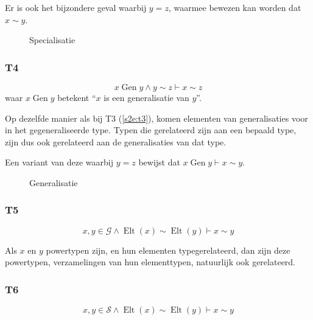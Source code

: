 \documentclass{article}
\newcommand{\Gen}{\ensuremath{\operatorname{Gen}}}
\begin{document}
Er is ook het bijzondere geval waarbij $y=z$, waarmee bewezen kan worden
dat $x \sim y$.

\begin{figure}
  \centering
  \caption{Specialisatie}
  \label{fig:specialisatie}
\end{figure}


\subsubsection{T4}
\[
  x \operatorname{Gen} y \wedge y \sim z \vdash x \sim z
\] waar $x \operatorname{Gen} y$ betekent ``$x$ is een generalisatie van $y$''.

Op dezelfde manier als bij T3 (\ref{s2e:t3}), komen elementen van
generalisaties voor in het gegeneraliseerde type. Typen die gerelateerd zijn aan 
een bepaald type, zijn dus ook gerelateerd aan de generalisaties
van dat type.

Een variant van deze waarbij $y=z$ bewijst dat $x \Gen y \vdash x \sim y$.


\begin{figure}[b]
  \centering
  \caption{Generalisatie}
  \label{fig:generalisatie}
\end{figure}

\subsubsection{T5}
\label{T5}
\[
  x,y \in \mathcal{G} \wedge \operatorname{Elt}(x) \sim 
  \operatorname{Elt}(y) \vdash x \sim y
\]

Als $x$ en $y$ powertypen zijn, en hun elementen typegerelateerd, 
dan zijn deze powertypen, verzamelingen van hun elementtypen,
natuurlijk ook gerelateerd.

\subsubsection{T6}
\[
  x,y \in \mathcal{S} \wedge \operatorname{Elt}(x) \sim 
  \operatorname{Elt}(y) \vdash x \sim y
\]
\end{document}
